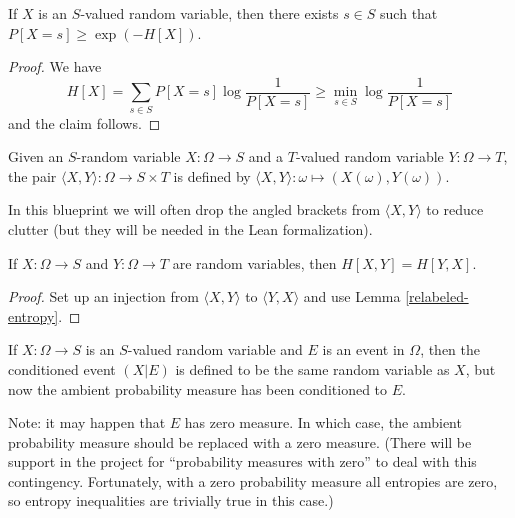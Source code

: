 \begin{lemma}\label{bound-conc}
  If $X$ is an $S$-valued random variable, then there exists $s \in S$ such that $P[X=s] \geq \exp(-H[X])$.
\end{lemma}

\begin{proof}  We have
$$ H[X] = \sum_{s \in S} P[X=s] \log \frac{1}{P[X=s]} \geq \min_{s \in S} \log \frac{1}{P[X=s]}$$
and the claim follows.
\end{proof}

\begin{definition}\label{pair-def}
  \leanok
Given an $S$-random variable $X: \Omega \to S$ and a $T$-valued random variable $Y: \Omega \to T$, the pair $\langle X,Y \rangle: \Omega \to S \times T$ is defined by $\langle X, Y \rangle: \omega \mapsto (X(\omega), Y(\omega))$.
\end{definition}

In this blueprint we will often drop the angled brackets from $\langle X, Y \rangle$ to reduce clutter (but they will be needed in the Lean formalization).

\begin{lemma}\label{joint-symm}   If $X: \Omega \to S$ and $Y: \Omega \to T$ are random variables, then $H[X,Y ] = H[ Y,X]$.\end{lemma}

\begin{proof} Set up an injection from $\langle X,Y\rangle$ to $\langle Y,X\rangle$ and use Lemma \ref{relabeled-entropy}.
\end{proof}


\begin{definition}\label{condition-event-def}  If $X: \Omega \to S$ is an $S$-valued random variable and $E$ is an event in $\Omega$, then the conditioned event $(X|E)$ is defined to be the same random variable as $X$, but now the ambient probability measure has been conditioned to $E$.
\end{definition}

Note: it may happen that $E$ has zero measure.  In which case, the ambient probability measure should be replaced with a zero measure.  (There will be support in the project for ``probability measures with zero'' to deal with this contingency.  Fortunately, with a zero probability measure all entropies are zero, so entropy inequalities are trivially true in this case.)


